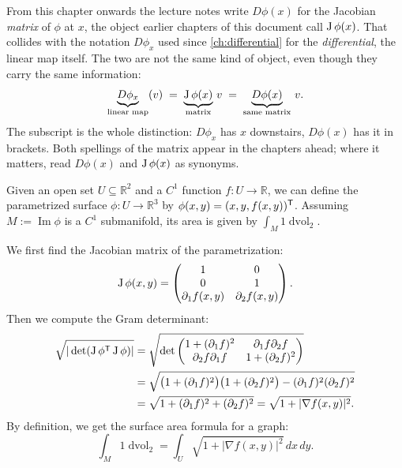\begin{remark}
\label{rem:notation_D_phi}
From this chapter onwards the lecture notes write $D\phi(x)$ for the Jacobian \emph{matrix} of
$\phi$ at $x$, the object earlier chapters of this document call $\operatorname{J}\phi(x)$. That collides
with the notation $D\phi_x$ used since \cref{ch:differential} for the \emph{differential}, the
linear map itself. The two are not the same kind of object, even though they carry the same
information:
\[\underbrace{D\phi_x}_{\text{linear map}}(v) \;=\; \underbrace{\operatorname{J}\phi(x)}_{\text{matrix}}\,v
  \;=\; \underbrace{D\phi(x)}_{\text{same matrix}}\,v.\]
The subscript is the whole distinction: $D\phi_x$ has $x$ downstairs, $D\phi(x)$ has it in
brackets. Both spellings of the matrix appear in the chapters ahead; where it matters, read
$D\phi(x)$ and $\operatorname{J}\phi(x)$ as synonyms.
\end{remark}

\begin{example}
\label{ex:integral_graph_function}
Given an open set $U \subseteq \mathbb{R}^2$ and a $C^1$ function $f: U \to \mathbb{R}$, we can define the parametrized surface $\phi: U \to \mathbb{R}^3$ by $\phi(x,y) = (x,y,f(x,y))^{\mathsf{T}}$.
Assuming $M := \operatorname{Im}\phi$ is a $C^1$ submanifold, its area is given by $\int_M 1 \mathop{d\text{vol}}_2$.

We first find the Jacobian matrix of the parametrization:
\[\operatorname{J}\phi(x,y) = \begin{pmatrix} 1 & 0 \\ 0 & 1 \\ \partial_1 f(x,y) & \partial_2 f(x,y) \end{pmatrix}.\]
Then we compute the Gram determinant:
\begin{align*}
\sqrt{|\det(\operatorname{J}\phi^{\mathsf{T}} \operatorname{J}\phi)|}
&= \sqrt{\det \begin{pmatrix} 1+(\partial_1 f)^2 & \partial_1 f \partial_2 f \\ \partial_2 f \partial_1 f & 1+(\partial_2 f)^2 \end{pmatrix}} \\
&= \sqrt{\big(1+(\partial_1 f)^2\big)\big(1+(\partial_2 f)^2\big) - (\partial_1 f)^2(\partial_2 f)^2} \\
&= \sqrt{1 + (\partial_1 f)^2 + (\partial_2 f)^2} = \sqrt{1+|\nabla f(x,y)|^2}.
\end{align*}
By definition, we get the surface area formula for a graph:
\[\int_M 1 \mathop{d\text{vol}}_2 = \int_U \sqrt{1+|\nabla f(x,y)|^2} \,dx\,dy.\]
\end{example}

